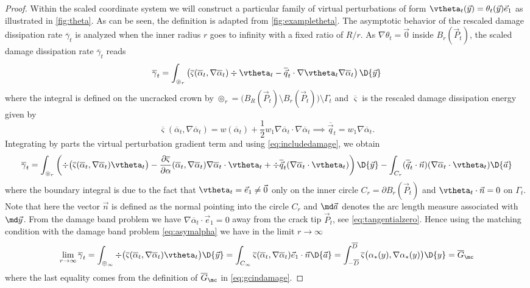 \begin{proof}
Within the scaled coordinate system we will construct a particular family of virtual perturbations of form $\vtheta_t(\vec{y})=\theta_t(\vec{y})\vec{e}_1$ as illustrated in \cref{fig:theta}. As can be seen, the definition is adapted from \cref{fig:exampletheta}. The asymptotic behavior of the rescaled damage dissipation rate $\overline{\gamma}_t$ is analyzed when the inner radius $r$ goes to infinity with a fixed ratio of $R/r$. As $\nabla\theta_t=\vec{0}$ inside $B_r(\vec{P}_t)$, the scaled damage dissipation rate $\overline{\gamma}_t$ reads
\[
\overline{\gamma}_t=\int_{\circledcirc_r}\left(\overline{\varsigma}(\overline{\alpha}_t,\nabla\overline{\alpha}_t)\div\vtheta_t-\overline{\vec{q}}_t\cdot\nabla\vtheta_t\nabla\overline{\alpha}_t\right)\D{\vec{y}}
\]
where the integral is defined on the uncracked crown by $\circledcirc_r=\bigl(B_R(\vec{P}_t)\setminus B_r(\vec{P}_t)\bigr)\setminus\Gamma_t$ and $\overline{\varsigma}$ is the rescaled damage dissipation energy given by
\[
\overline{\varsigma}(\overline{\alpha}_t,\nabla\overline{\alpha}_t)=w(\overline{\alpha}_t)+\frac{1}{2}w_1\nabla\overline{\alpha}_t\cdot\nabla\overline{\alpha}_t\implies\overline{\vec{q}}_t=w_1\nabla\overline{\alpha}_t.
\]
Integrating by parts the virtual perturbation gradient term and using \eqref{eq:includedamage}, we obtain
\[
\overline{\gamma}_t=\int_{\circledcirc_r}\left(\div\bigl(\overline{\varsigma}(\overline{\alpha}_t,\nabla\overline{\alpha}_t)\vtheta_t\bigr)-\frac{\partial\overline{\varsigma}}{\partial\alpha}(\overline{\alpha}_t,\nabla\overline{\alpha}_t)\nabla\overline{\alpha}_t\cdot\vtheta_t+\div\overline{\vec{q}}_t(\nabla\overline{\alpha}_t\cdot\vtheta_t)\right)\D{\vec{y}}-\int_{C_r}(\overline{\vec{q}}_t\cdot\vec{n})(\nabla\overline{\alpha}_t\cdot\vtheta_t)\D{\vec{a}}
\]
where the boundary integral is due to the fact that $\vtheta_t=\vec{e}_1\neq\vec{0}$ only on the inner circle $C_r=\partial B_r(\vec{P}_t)$ and $\vtheta_t\cdot\vec{n}=0$ on $\Gamma_t$. Note that here the vector $\vec{n}$ is defined as the normal pointing into the circle $C_r$ and $\md\vec{a}$ denotes the arc length measure associated with $\md\vec{y}$. From the damage band problem we have $\nabla\overline{\alpha}_t\cdot\vec{e}_1=0$ away from the crack tip $\vec{P}_t$, see \eqref{eq:tangentialzero}. Hence using the matching condition with the damage band problem \eqref{eq:asymalpha} we have in the limit $r\to\infty$
\[
\lim_{r\to\infty}\overline{\gamma}_t=\int_{\circledcirc_\infty}\div\bigl(\overline{\varsigma}(\overline{\alpha}_t,\nabla\overline{\alpha}_t)\vtheta_t\bigr)\D{\vec{y}}=\int_{C_\infty}\overline{\varsigma}(\overline{\alpha}_t,\nabla\overline{\alpha}_t)\vec{e}_1\cdot\vec{n}\D{\vec{a}}=\int_{-\overline{D}}^{\overline{D}}\overline{\varsigma}\bigl(\alpha_*(y),\nabla\alpha_*(y)\bigr)\D{y}=\overline{G}_\mc
\]
where the last equality comes from the definition of $\overline{G}_\mc$ in \eqref{eq:gcindamage}.
\end{proof}


